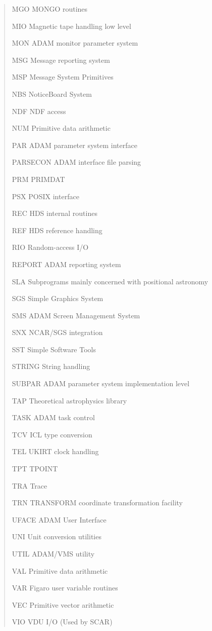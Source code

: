 \documentclass[twoside,11pt,nolof,noabs]{starlink}
\renewcommand{\_}{{\tt\char'137}}
\begin{document}
\begin{quote}
\begin{aligndesc}
\item[MGO] MONGO routines
\item[MIO] Magnetic tape handling low level
\item[MON] ADAM monitor parameter system
\item[MSG] Message reporting system
\item[MSP] Message System Primitives
\item[NBS] NoticeBoard System
\item[NDF] NDF access
\item[NUM] Primitive data arithmetic
\item[PAR] ADAM parameter system interface
\item[PARSECON] ADAM interface file parsing
\item[PRM] PRIMDAT
\item[PSX] POSIX interface
\item[REC] HDS internal routines
\item[REF] HDS reference handling
\item[RIO] Random-access I/O
\item[REPORT] ADAM reporting system
\item[SLA] Subprograms mainly concerned with positional astronomy
\item[SGS] Simple Graphics System
\item[SMS] ADAM Screen Management System
\item[SNX] NCAR/SGS integration
\item[SST] Simple Software Tools
\item[STRING] String handling
\item[SUBPAR] ADAM parameter system implementation level
\item[TAP] Theoretical astrophysics library
\item[TASK] ADAM task control
\item[TCV] ICL type conversion
\item[TEL] UKIRT clock handling
\item[TPT] TPOINT
\item[TRA] Trace
\item[TRN] TRANSFORM coordinate transformation facility
\item[UFACE] ADAM User Interface
\item[UNI] Unit conversion utilities
\item[UTIL] ADAM/VMS utility
\item[VAL] Primitive data arithmetic
\item[VAR] Figaro user variable routines
\item[VEC] Primitive vector arithmetic
\item[VIO] VDU I/O (Used by SCAR)
\end{aligndesc}
\end{quote}
\end{document}
